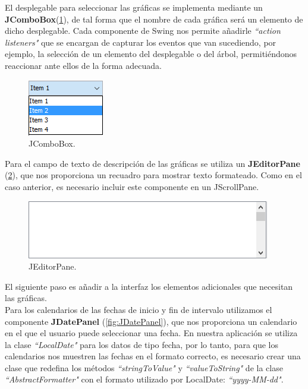 \documentclass[12pt, a4paper]{book}
\begin{document}
El desplegable para seleccionar las gráficas se implementa mediante un \textbf{JComboBox}(\ref{fig:JComboBox}), de tal forma que el nombre de cada gráfica será un elemento de dicho desplegable. Cada componente de Swing nos permite añadirle \textit{``action listeners"} que se encargan de capturar los eventos que van sucediendo, por ejemplo, la selección de un elemento del desplegable o del árbol, permitiéndonos reaccionar ante ellos de la forma adecuada.

\begin{figure}[htbp]
	\centering
	\includegraphics{figuras/JComboBox.png}
	\caption{JComboBox.}
	\label{fig:JComboBox}
	\end {figure}

Para el campo de texto de descripción de las gráficas se utiliza un \textbf{JEditorPane} (\ref{fig:JEditorPane}), que nos proporciona un recuadro para mostrar texto formateado. Como en el caso anterior, es necesario incluir este componente en un JScrollPane.

\begin{figure}[htbp]
	\centering
	\includegraphics{figuras/JEditorPane.png}
	\caption{JEditorPane.}
	\label{fig:JEditorPane}
	\end {figure}
\newpage

El siguiente paso es añadir a la interfaz los elementos adicionales que necesitan las gráficas.\\

Para los calendarios de las fechas de inicio y fin de intervalo utilizamos el componente \textbf{JDatePanel} (\ref{fig:JDatePanel}), que nos proporciona un calendario en el que el usuario puede seleccionar una fecha. En nuestra aplicación se utiliza la clase \textit{``LocalDate"} para los datos de tipo fecha, por lo tanto, para que los calendarios nos muestren las fechas en el formato correcto, es necesario crear una clase que redefina los métodos \textit{``stringToValue"} y \textit{``valueToString"} de la clase \textit{``AbstractFormatter"} con el formato utilizado por LocalDate: \textit{``yyyy-MM-dd"}.
\end{document}
